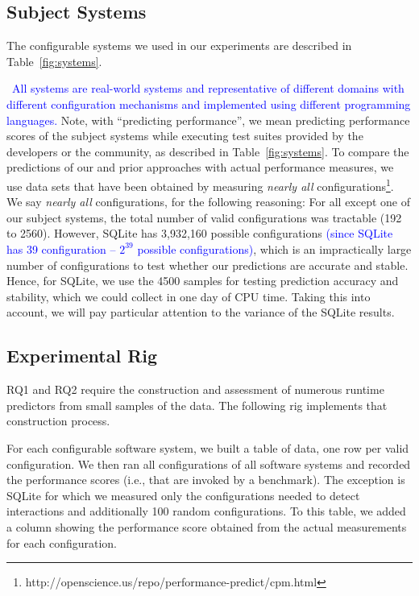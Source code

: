 \documentclass[smallextended]{svjour3}       %
\newcommand{\respto}[1]{
    \fcolorbox{black}{black!15}{
    \label{response:#1}
    \textbf{R-{#1}}}
}
\begin{document}
\subsection{Subject Systems}
\label{sec:subject_systems}
The configurable systems we used in our experiments are described in Table~\ref{fig:systems}.
\respto{2c}~\textcolor{blue}{All systems are real-world systems and representative of different  domains  with  different  configuration  mechanisms  and  implemented  using different programming languages.}
Note, with ``predicting performance'', we 
mean predicting performance scores of the subject systems while executing test suites provided by the developers or the community, as described in Table~\ref{fig:systems}.
To compare the predictions of our and prior approaches with actual performance measures, we use data sets that have been obtained by
measuring {\em nearly all} configurations\footnote{http://openscience.us/repo/performance-predict/cpm.html}.
We say {\em nearly all} configurations, for the following reasoning: For 
all except one of our subject systems, the total number of valid configurations
was tractable (192 to 2560). However,  SQLite has 3,932,160 
possible configurations \respto{2d}\textcolor{blue}{(since SQLite has 39 configuration -- $2^{39}$ possible configurations)}, which is an impractically large number of configurations to test whether our predictions are accurate and stable. Hence, for SQLite, we use the 4500 samples for testing prediction accuracy and stability, which we could collect in one day of CPU time. Taking this into account, we will pay particular attention to the variance of the SQLite results.






\subsection{Experimental Rig}\label{sec:exp_rig}


RQ1 and RQ2 require the construction and assessment of numerous runtime predictors from small samples
of the data. The following rig implements that construction process.

For each configurable software system, we built a table of data, one row per valid configuration. We then ran all configurations of all software systems
and recorded the performance scores (i.e., that are invoked by a benchmark).
The exception is SQLite for which we measured only the
configurations needed to detect interactions and additionally
100 random configurations.  
To this table, we added a column showing the performance score obtained from the actual measurements for each configuration.
\end{document}

